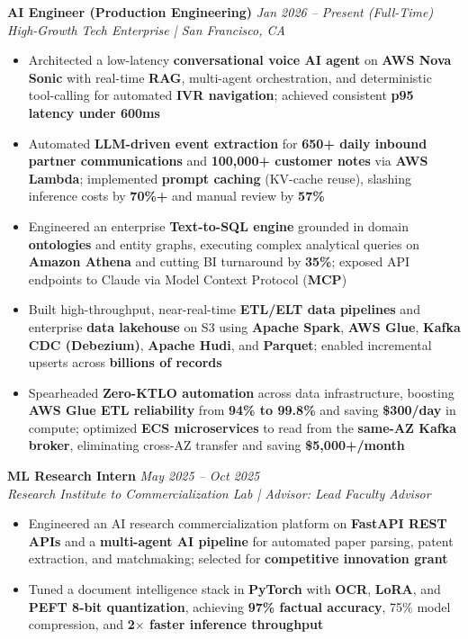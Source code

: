 \documentclass[10pt]{article}
\begin{document}
\textbf{AI Engineer (Production Engineering)} \hfill \textcolor{subheadingcolor}{\textit{Jan 2026 -- Present (Full-Time)}} \\
\textit{High-Growth Tech Enterprise | San Francisco, CA}
\begin{itemize}
    \item Architected a low-latency \textbf{conversational voice AI agent} on \textbf{AWS Nova Sonic} with real-time \textbf{RAG}, multi-agent orchestration, and deterministic tool-calling for automated \textbf{IVR navigation}; achieved consistent \textbf{p95 latency under 600ms}
    \item Automated \textbf{LLM-driven event extraction} for \textbf{650+ daily inbound partner communications} and \textbf{100,000+ customer notes} via \textbf{AWS Lambda}; implemented \textbf{prompt caching} (KV-cache reuse), slashing inference costs by \textbf{70\%+} and manual review by \textbf{57\%}
    \item Engineered an enterprise \textbf{Text-to-SQL engine} grounded in domain \textbf{ontologies} and entity graphs, executing complex analytical queries on \textbf{Amazon Athena} and cutting BI turnaround by \textbf{35\%}; exposed API endpoints to Claude via Model Context Protocol (\textbf{MCP})
    \item Built high-throughput, near-real-time \textbf{ETL/ELT data pipelines} and enterprise \textbf{data lakehouse} on S3 using \textbf{Apache Spark}, \textbf{AWS Glue}, \textbf{Kafka CDC (Debezium)}, \textbf{Apache Hudi}, and \textbf{Parquet}; enabled incremental upserts across \textbf{billions of records}
    \item Spearheaded \textbf{Zero-KTLO automation} across data infrastructure, boosting \textbf{AWS Glue ETL reliability} from \textbf{94\% to 99.8\%} and saving \textbf{\$300/day} in compute; optimized \textbf{ECS microservices} to read from the \textbf{same-AZ Kafka broker}, eliminating cross-AZ transfer and saving \textbf{\$5,000+/month}
\end{itemize}
\vspace{-0.3em}

\textbf{ML Research Intern} \hfill \textcolor{subheadingcolor}{\textit{May 2025 -- Oct 2025}} \\
\textit{Research Institute to Commercialization Lab | Advisor: Lead Faculty Advisor}
\begin{itemize}
    \item Engineered an AI research commercialization platform on \textbf{FastAPI REST APIs} and a \textbf{multi-agent AI pipeline} for automated paper parsing, patent extraction, and matchmaking; selected for \textbf{competitive innovation grant}
    \item Tuned a document intelligence stack in \textbf{PyTorch} with \textbf{OCR}, \textbf{LoRA}, and \textbf{PEFT 8-bit quantization}, achieving \textbf{97\% factual accuracy}, 75\% model compression, and \textbf{2$\times$ faster inference throughput}
\end{itemize}
\vspace{-0.3em}
\end{document}
